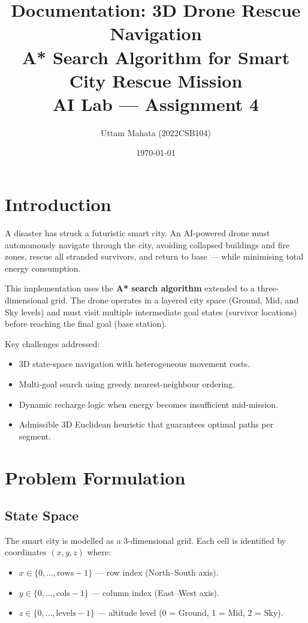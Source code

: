 \documentclass[12pt]{article}
\title{\textbf{Documentation: 3D Drone Rescue Navigation} \\
       \large A* Search Algorithm for Smart City Rescue Mission \\
       \large AI Lab — Assignment 4}
\author{Uttam Mahata (2022CSB104)}
\date{\today}
\begin{document}
\maketitle
\tableofcontents
\newpage

\section{Introduction}

A disaster has struck a futuristic smart city.
An AI-powered drone must autonomously navigate through the city, avoiding
collapsed buildings and fire zones, rescue all stranded survivors, and return
to base — while minimising total energy consumption.

This implementation uses the \textbf{A* search algorithm} extended to a
three-dimensional grid.  The drone operates in a layered city space (Ground,
Mid, and Sky levels) and must visit multiple intermediate goal states
(survivor locations) before reaching the final goal (base station).

Key challenges addressed:
\begin{itemize}
    \item 3D state-space navigation with heterogeneous movement costs.
    \item Multi-goal search using greedy nearest-neighbour ordering.
    \item Dynamic recharge logic when energy becomes insufficient mid-mission.
    \item Admissible 3D Euclidean heuristic that guarantees optimal paths per segment.
\end{itemize}

\section{Problem Formulation}

\subsection{State Space}

The smart city is modelled as a 3-dimensional grid.
Each cell is identified by coordinates $(x, y, z)$ where:
\begin{itemize}
    \item $x \in \{0, \ldots, \text{rows}-1\}$ — row index (North–South axis).
    \item $y \in \{0, \ldots, \text{cols}-1\}$ — column index (East–West axis).
    \item $z \in \{0, \ldots, \text{levels}-1\}$ — altitude level (0 = Ground, 1 = Mid, 2 = Sky).
\end{itemize}
\end{document}
